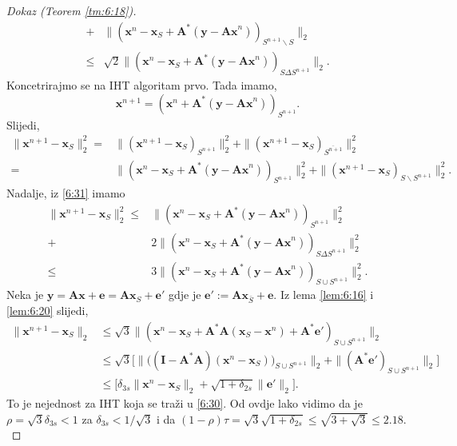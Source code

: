 \documentclass[a4paper,twoside,12pt]{memoir} %
\newcommand{\vect}[1]{\mathbf{#1}}
\renewcommand{\vec}{\vect}
\newcommand{\norm}[1]{\|{#1}\|}
\begin{document}
\begin{proof}[Dokaz (Teorem \ref{tm:6:18})]
\begin{align}
        + & \norm{(\vec x^n - \vec x_S + \vec A^*(\vec y - \vec{Ax}^n))_{S^{n+1} \backslash S}}_2 \nonumber \\
        \leq & \sqrt{2} \norm{(\vec x^n - \vec x_S + \vec A^*(\vec y - \vec{Ax}^n))_{S \Delta S^{n+1}}}_2.\label{6:31}
    \end{align}
    Koncetrirajmo se na IHT algoritam prvo. Tada imamo,
    \begin{equation*}
        \vec x^{n+1} = (\vec x^n + \vec A^*(\vec y - \vec{Ax}^n))_{S^{n+1}}.
    \end{equation*}
    Slijedi,
    \begin{align*}
        \norm{\vec x^{n+1} - \vec x_S}_2^2 = & \norm{(\vec x^{n+1} - \vec x_S)_{S^{n+1}}}_2^2 + \norm{(\vec x^{n+1} - \vec x_S)_{\overline{S^{n+1}}}}_2^2\\
        = & \norm{(\vec x^n - \vec x_S + \vec A^*(\vec y - \vec{Ax}^n))_{S^{n+1}}}_2^2 + \norm{(\vec x^{n+1} - \vec x_S)_{S \backslash S^{n+1}}}_2^2.
    \end{align*}
    Nadalje, iz \eqref{6:31} imamo
    \begin{align*}
        \norm{\vec x^{n+1} - \vec x_S}_2^2 \leq & \norm{(\vec x^n - \vec x_S + \vec A^*(\vec y - \vec{Ax}^n))_{S^{n+1}}}_2^2\\
        +&2\norm{(\vec x^n - \vec x_S + \vec A^*(\vec y - \vec{Ax}^n))_{S \Delta S^{n+1}}}_2^2 \\
        \leq & 3 \norm{(\vec x^n - \vec x_S + \vec A^* (\vec y - \vec{Ax}^n))_{S \cup S^{n+1}}}_2^2.
    \end{align*}
    Neka je $\vec y = \vec{Ax} + \vec e = \vec{Ax}_S + \vec e'$ gdje je $\vec e' := \vec {Ax}_{\bar S} + \vec e$. Iz lema \ref{lem:6:16} i \ref{lem:6:20} slijedi,
    \begin{align*}
        \norm{\vec x^{n+1} - \vec x_S}_2 & \leq \sqrt{3} \norm{(\vec x^n - \vec x_S + \vec A^* \vec A (\vec x_S - \vec x^n) + \vec A^* \vec e')_{S \cup S^{n+1}}}_2\\ 
        & \leq \sqrt{3}\big[ \norm{ \big( (\vec I - \vec A^*\vec A)(\vec x^n - \vec x_S) \big)_{S \cup S^{n+1}}}_2 + \norm{(\vec A^*\vec e')_{S \cup S^{n+1}}}_2 \big]\\
        & \leq \big[ \delta_{3s}\norm{\vec x^n - \vec x_S}_2 + \sqrt{1+\delta_{2s}}\norm{\vec e'}_2 \big].
    \end{align*}
    To je nejednost za IHT koja se tra\v{z}i u \eqref{6:30}. Od ovdje lako vidimo da je $\rho = \sqrt{3}\delta_{3s} < 1$ za $\delta_{3s} < 1/\sqrt{3}$ i da $(1-\rho)\tau = \sqrt{3}\sqrt{1+\delta_{2s}} \leq \sqrt{3 + \sqrt{3}} \leq 2.18$.\\

\end{proof}
\end{document}
